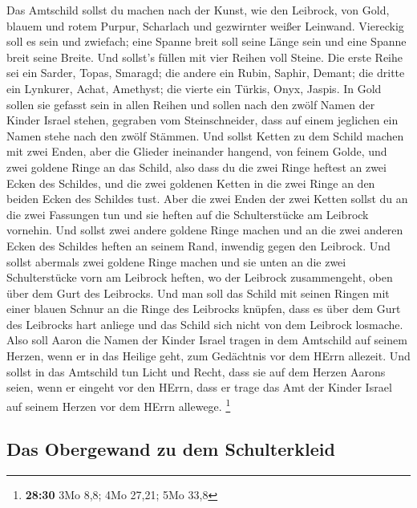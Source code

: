  Das Amtschild sollst du machen nach der Kunst, wie den
Leibrock, von Gold, blauem und rotem Purpur, Scharlach und gezwirnter
weißer Leinwand.  Viereckig soll es sein und zwiefach;
eine Spanne breit soll seine Länge sein und eine Spanne breit seine
Breite.  Und sollst's füllen mit vier Reihen voll Steine.
Die erste Reihe sei ein Sarder, Topas, Smaragd;  die
andere ein Rubin, Saphir, Demant;  die dritte ein
Lynkurer, Achat, Amethyst;  die vierte ein Türkis, Onyx,
Jaspis. In Gold sollen sie gefasst sein in allen Reihen 
und sollen nach den zwölf Namen der Kinder Israel stehen, gegraben vom
Steinschneider, dass auf einem jeglichen ein Namen stehe nach den zwölf
Stämmen.  Und sollst Ketten zu dem Schild machen mit zwei
Enden, aber die Glieder ineinander hangend, von feinem Golde,
 und zwei goldene Ringe an das Schild, also dass du die
zwei Ringe heftest an zwei Ecken des Schildes,  und die
zwei goldenen Ketten in die zwei Ringe an den beiden Ecken des Schildes
tust.  Aber die zwei Enden der zwei Ketten sollst du an
die zwei Fassungen tun und sie heften auf die Schulterstücke am Leibrock
vornehin.  Und sollst zwei andere goldene Ringe machen
und an die zwei anderen Ecken des Schildes heften an seinem Rand,
inwendig gegen den Leibrock.  Und sollst abermals zwei
goldene Ringe machen und sie unten an die zwei Schulterstücke vorn am
Leibrock heften, wo der Leibrock zusammengeht, oben über dem Gurt des
Leibrocks.  Und man soll das Schild mit seinen Ringen mit
einer blauen Schnur an die Ringe des Leibrocks knüpfen, dass es über dem
Gurt des Leibrocks hart anliege und das Schild sich nicht von dem
Leibrock losmache.  Also soll Aaron die Namen der Kinder
Israel tragen in dem Amtschild auf seinem Herzen, wenn er in das Heilige
geht, zum Gedächtnis vor dem HErrn allezeit.  Und sollst
in das Amtschild tun Licht und Recht, dass sie auf dem Herzen Aarons
seien, wenn er eingeht vor den HErrn, dass er trage das Amt der Kinder
Israel auf seinem Herzen vor dem HErrn allewege. \footnote{\textbf{28:30}
  3Mo 8,8; 4Mo 27,21; 5Mo 33,8}

\hypertarget{das-obergewand-zu-dem-schulterkleid}{%
\subsection{Das Obergewand zu dem
Schulterkleid}\label{das-obergewand-zu-dem-schulterkleid}}


